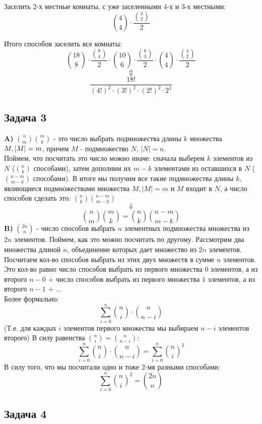 \documentclass{article}
\begin{document}
Заселить 2-х местные комнаты, с уже заселенными 4-х и 3-х местными:
$${4 \choose 4} \cdot \frac{ {4 \choose 2}}{2} $$

Итого способов заселить все комнаты:
$${18 \choose 8} \cdot \frac{ {8 \choose 4}}{2} \cdot {10 \choose 6} \cdot \frac{ {6 \choose 3}}{2} \cdot {4 \choose 4} \cdot \frac{ {4 \choose 2}}{2} $$
$$\Updownarrow$$
$$ \frac{18!}{(4!)^2 \cdot (3!)^2 \cdot  (2!)^2 \cdot 2^3 } $$


\begin{center}
	\subsection*{Задача 3}
\end{center}

\textbf{A)} $ {n \choose m}{m \choose k} $ - это число выбрать подмножества длины $k$ множества $M,\\ |M| = m$, причем $M$ - подмножество $N$, $|N| = n$.\\
Поймем, что посчитать это число можно иначе: сначала выберем $k$ элементов из $N$ (${n \choose k}$ способами), затем дополним их $m - k$ элементами из оставшихся в $N$ (${n - m \choose m - k}$ способами). В итоге мы получим все такие подмножества длины $k$, являющиеся подмножествами множества $M, |M| = m$ и $M$ входит в $N$, а число способов сделать это: ${n \choose k}{n - m \choose m - k}$
$$ \Downarrow $$
$$ {n \choose m}{m \choose k} = {n \choose k}{n - m \choose m - k} $$
\textbf{B)} ${2n \choose n}$ - число способов выбрать $n$ элементных подмножества множества из $2n$ элементов. Поймем, как это можно посчитать по другому. Рассмотрим два множества длиной $n$, объединение которых дает множество из $2n$ элементов. Посчитаем кол-во способов выбрать из этих двух множеств в сумме $n$ элементов. 
Это кол-во равно число способов выбрать из первого множества $0$ элементов, а из второго $n - 0$ + число способов выбрать из первого множества $1$ элементов, а из второго $n - 1$ + ...
\\
Более формально:
	$$ \sum_{i=0}^{n} {n \choose i} \cdot {n \choose n - i}$$
(Т.е. для каждых $i$ элементов первого множества мы выбираем $n - i$ элементов второго)
В силу равенства  $ {n \choose i} = {n \choose n - i} $:
	$$ \sum_{i=0}^{n} {n \choose i} \cdot {n \choose n - i} = \sum_{i=0}^{n} {n \choose i}^2 $$
В силу того, что мы посчитали одно и тоже 2-мя разными способами:
	$$\sum_{i=0}^{n} {n \choose i}^2 =  {2n \choose n} $$
	
\begin{center}
	\subsection*{Задача 4}
\end{center}
\end{document}
